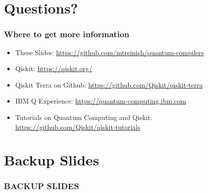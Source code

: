 \documentclass[aspectratio=169,11pt,hyperref={colorlinks=true}]{beamer}
\begin{document}
\section{Questions?}
\begin{frame}
\frametitle{Where to get more information}
    \begin{itemize}
        \item These Slides: \href{https://github.com/mtreinish/quantum-compilers}{https://github.com/mtreinish/quantum-compilers}
        \item Qiskit: \href{https://qiskit.org/}{https://qiskit.org/}
        \item Qiskit Terra on Github: \href{https://github.com/Qiskit/qiskit-terra}{https://github.com/Qiskit/qiskit-terra}
        \item IBM Q Experience: \href{https://quantum-computing.ibm.com}{https://quantum-computing.ibm.com}
        \item Tutorials on Quantum Computing and Qiskit: \href{https://github.com/Qiskit/qiskit-tutorials}{https://github.com/Qiskit/qiskit-tutorials}
    \end{itemize}
\end{frame}

\section{Backup Slides}
\begin{frame}[noframenumbering]
    \frametitle{BACKUP SLIDES}
\end{frame}
\end{document}
